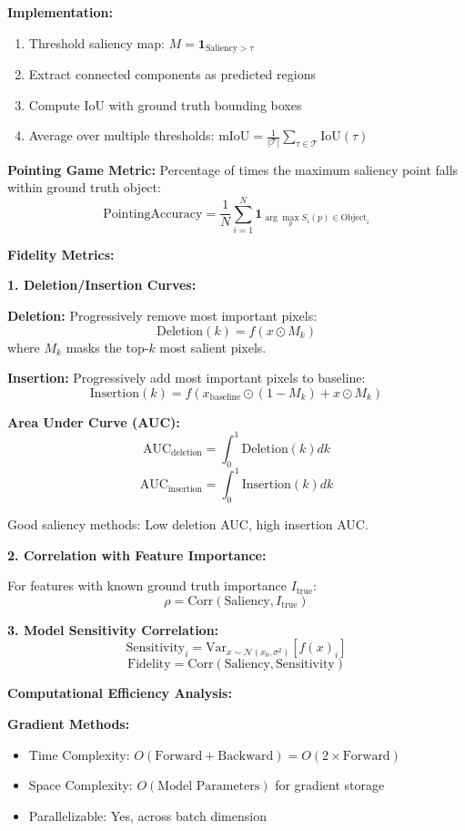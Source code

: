 \documentclass[12pt]{article}
\begin{document}
\begin{enumerate}[(a)]
{    \textbf{Implementation:}
    \begin{enumerate}
        \item Threshold saliency map: $M = \mathbf{1}_{\text{Saliency} > \tau}$
        \item Extract connected components as predicted regions
        \item Compute IoU with ground truth bounding boxes
        \item Average over multiple thresholds: $\text{mIoU} = \frac{1}{|\mathcal{T}|}\sum_{\tau \in \mathcal{T}} \text{IoU}(\tau)$
    \end{enumerate}
    
    \textbf{Pointing Game Metric:}
    Percentage of times the maximum saliency point falls within ground truth object:
    $$\text{PointingAccuracy} = \frac{1}{N}\sum_{i=1}^N \mathbf{1}_{\arg\max_p S_i(p) \in \text{Object}_i}$$
    
    \textbf{Fidelity Metrics:}
    
    \textbf{1. Deletion/Insertion Curves:}
    
    \textbf{Deletion:} Progressively remove most important pixels:
    $$\text{Deletion}(k) = f(x \odot M_k)$$
    where $M_k$ masks the top-$k$ most salient pixels.
    
    \textbf{Insertion:} Progressively add most important pixels to baseline:
    $$\text{Insertion}(k) = f(x_{\text{baseline}} \odot (1-M_k) + x \odot M_k)$$
    
    \textbf{Area Under Curve (AUC):}
    $$\text{AUC}_{\text{deletion}} = \int_0^1 \text{Deletion}(k) dk$$
    $$\text{AUC}_{\text{insertion}} = \int_0^1 \text{Insertion}(k) dk$$
    
    Good saliency methods: Low deletion AUC, high insertion AUC.
    
    \textbf{2. Correlation with Feature Importance:}
    
    For features with known ground truth importance $I_{\text{true}}$:
    $$\rho = \text{Corr}(\text{Saliency}, I_{\text{true}})$$
    
    \textbf{3. Model Sensitivity Correlation:}
    $$\text{Sensitivity}_i = \text{Var}_{x \sim \mathcal{N}(x_0, \sigma^2)}[f(x)_i]$$
    $$\text{Fidelity} = \text{Corr}(\text{Saliency}, \text{Sensitivity})$$
    
    \textbf{Computational Efficiency Analysis:}
    
    \textbf{Gradient Methods:}
    \begin{itemize}
        \item Time Complexity: $O(\text{Forward} + \text{Backward}) = O(2 \times \text{Forward})$
        \item Space Complexity: $O(\text{Model Parameters})$ for gradient storage
        \item Parallelizable: Yes, across batch dimension
    \end{itemize}
    
}
\end{enumerate}
\end{document}

